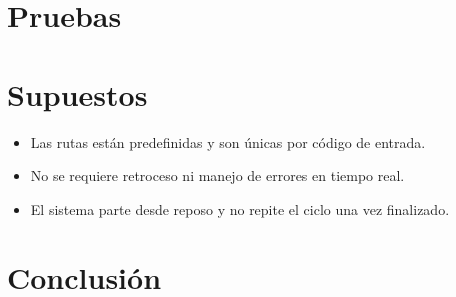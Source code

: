\documentclass[12pt]{article}
\begin{document}
\section{Pruebas}

\section{Supuestos}
\begin{itemize}
    \item Las rutas están predefinidas y son únicas por código de entrada.
    \item No se requiere retroceso ni manejo de errores en tiempo real.
    \item El sistema parte desde reposo y no repite el ciclo una vez finalizado.
\end{itemize}

\section{Conclusión}
\end{document}
